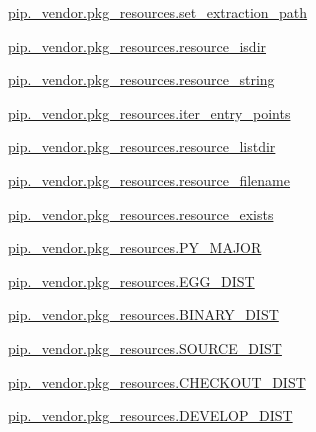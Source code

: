 \begin{DoxyCompactItemize}
\item 
\hyperlink{namespacepip_1_1__vendor_1_1pkg__resources_ae1631475fc43e6ce28a2351eb8d1f040}{pip.\+\_\+vendor.\+pkg\+\_\+resources.\+set\+\_\+extraction\+\_\+path}
\item 
\hyperlink{namespacepip_1_1__vendor_1_1pkg__resources_a44c128565c1d52e4aa2f518048a6f686}{pip.\+\_\+vendor.\+pkg\+\_\+resources.\+resource\+\_\+isdir}
\item 
\hyperlink{namespacepip_1_1__vendor_1_1pkg__resources_afa5aee3ca81e380fedb2f22c6bbfa9f4}{pip.\+\_\+vendor.\+pkg\+\_\+resources.\+resource\+\_\+string}
\item 
\hyperlink{namespacepip_1_1__vendor_1_1pkg__resources_ac92560c8c92b56f6cbfa820acbf33d4c}{pip.\+\_\+vendor.\+pkg\+\_\+resources.\+iter\+\_\+entry\+\_\+points}
\item 
\hyperlink{namespacepip_1_1__vendor_1_1pkg__resources_a499c4bd58814280f577c83fd244d0c2e}{pip.\+\_\+vendor.\+pkg\+\_\+resources.\+resource\+\_\+listdir}
\item 
\hyperlink{namespacepip_1_1__vendor_1_1pkg__resources_afff8ed5b060049087e8ae3911244b5ed}{pip.\+\_\+vendor.\+pkg\+\_\+resources.\+resource\+\_\+filename}
\item 
\hyperlink{namespacepip_1_1__vendor_1_1pkg__resources_ae99c5a05d829e55491c809fc27e6932a}{pip.\+\_\+vendor.\+pkg\+\_\+resources.\+resource\+\_\+exists}
\item 
\hyperlink{namespacepip_1_1__vendor_1_1pkg__resources_acca7e38274a92063eabc8c2b739d5ca4}{pip.\+\_\+vendor.\+pkg\+\_\+resources.\+P\+Y\+\_\+\+M\+A\+J\+OR}
\item 
\hyperlink{namespacepip_1_1__vendor_1_1pkg__resources_a2d337406bae844cdf2c7ed99345eb6b3}{pip.\+\_\+vendor.\+pkg\+\_\+resources.\+E\+G\+G\+\_\+\+D\+I\+ST}
\item 
\hyperlink{namespacepip_1_1__vendor_1_1pkg__resources_ae2a48cdece9f08ea83414721ae5790b2}{pip.\+\_\+vendor.\+pkg\+\_\+resources.\+B\+I\+N\+A\+R\+Y\+\_\+\+D\+I\+ST}
\item 
\hyperlink{namespacepip_1_1__vendor_1_1pkg__resources_a1054b0e67ef1d25c4633b3027539f06e}{pip.\+\_\+vendor.\+pkg\+\_\+resources.\+S\+O\+U\+R\+C\+E\+\_\+\+D\+I\+ST}
\item 
\hyperlink{namespacepip_1_1__vendor_1_1pkg__resources_a74cd65e9d757b6092c997307e484e97b}{pip.\+\_\+vendor.\+pkg\+\_\+resources.\+C\+H\+E\+C\+K\+O\+U\+T\+\_\+\+D\+I\+ST}
\item 
\hyperlink{namespacepip_1_1__vendor_1_1pkg__resources_a4af7228d520b5f3a7813026c79fd6819}{pip.\+\_\+vendor.\+pkg\+\_\+resources.\+D\+E\+V\+E\+L\+O\+P\+\_\+\+D\+I\+ST}

\end{DoxyCompactItemize}
